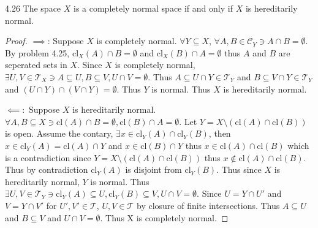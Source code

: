 \documentclass{article}
\newcommand*{\T}{\mathcal{T}}
\newcommand*{\cl}{\mathrm{cl}}
\newcommand*{\subeq}{\subseteq}
\begin{document}
\bigskip

\begin{PROB}{4.26}\label{Problem 4.26.}
    The space $X$ is a completely normal space if and only if $X$  is hereditarily normal.
\end{PROB}
\begin{proof}
    $\implies$: Suppose $X$ is completely normal. $\forall Y \subseteq X$, $\forall A, B \in \mathcal{C}_Y \ni A \cap B = \emptyset$. By problem 4.25, $\cl_X(A) \cap B = \emptyset$ and $\cl_X(B) \cap A = \emptyset$ thus $A$ and $B$ are seperated sets in $X$. Since $X$ is completely normal, $\exists U, V \in \T_X \ni A \subseteq U, B \subseteq V, U \cap V = \emptyset$. Thus $A \subseteq U \cap Y \in \T_Y$ and $B \subseteq V \cap Y \in \T_Y$ and $(U \cap Y) \cap (V \cap Y) = \emptyset$. Thus $Y$ is normal. Thus $X$ is hereditarily normal. 
    
    $\impliedby:$ Suppose $X$ is hereditarily normal. $\forall A, B \subseteq X \ni \cl(A) \cap B = \emptyset, \cl(B) \cap A = \emptyset$. Let $Y = X \setminus (\cl(A) \cap \cl(B))$ is open. Assume the contary, $\exists x \in \cl_Y(A) \cap \cl_Y(B)$, then $x \in \cl_Y(A) = \cl(A) \cap Y$ and $x \in \cl(B) \cap Y$ thus $x \in \cl(A) \cap \cl(B)$ which is a contradiction since $Y = X \setminus (\cl(A) \cap \cl(B))$ thus $x \not \in \cl(A) \cap \cl(B)$. Thus by contradiction $\cl_Y(A)$ is disjoint from $\cl_Y(B)$. Thus since $X$ is hereditarily normal, $Y$ is normal. Thus $\exists U, V \in \T_Y \ni \cl_Y(A) \subeq U, \cl_Y(B) \subeq V, U \cap V = \emptyset$. Since $U = Y \cap U'$ and $V= Y \cap V'$ for $U', V' \in \T$, $U ,V \in \T$ by closure of finite intersections. Thus $A \subseteq U$ and $B \subseteq V$ and $U \cap V = \emptyset$. Thus X is completely normal.                        
\end{proof}

\bigskip
\end{document}
